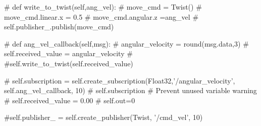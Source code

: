 # def write_to_twist(self,ang_vel):
#     move_cmd = Twist()
#     move_cmd.linear.x = 0.5
#     move_cmd.angular.z =ang_vel
#     self.publisher_.publish(move_cmd)

# def ang_vel_callback(self,msg):
#     angular_velocity = round(msg.data,3)
#     self.received_value = angular_velocity
#     #self.write_to_twist(self.received_value)
    
# self.subscription = self.create_subscription(Float32,'/angular_velocity', self.ang_vel_callback, 10)
# self.subscription  # Prevent unused variable warning
# self.received_value = 0.00
# self.out=0 

#self.publisher_ = self.create_publisher(Twist, '/cmd_vel', 10)

